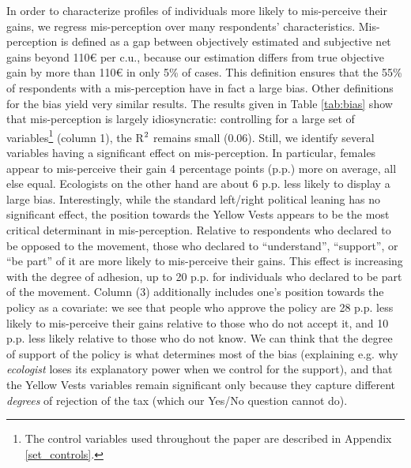 \documentclass[12pt]{article} %
\providecommand{\DIFaddend}{} %
\DeclareRobustCommand{\DIFaddend}{\DIFOaddend \let\includegraphics\DIFOincludegraphics} %
\begin{document}
\DIFaddend In order to characterize profiles of individuals more likely to mis-perceive their gains, we regress mis-perception over many respondents' characteristics. Mis-perception is defined as a gap between objectively estimated and subjective net gains beyond 110\euro{} per c.u., because our estimation differs from true objective gain by more than 110\euro{} in only 5\% of cases. This definition ensures that the 55\% of respondents with a mis-perception have in fact a large bias. Other definitions for the bias yield very similar results. The results given in Table \ref{tab:bias} show that mis-perception is largely idiosyncratic: controlling for a large set of variables\footnote{The control variables used throughout the paper are described in Appendix \ref{set_controls}.} (column 1), the R$^\textnormal{2}$ remains small (0.06). Still, we identify several variables having a significant effect on mis-perception. In particular, females appear to mis-perceive their gain 4 percentage points (p.p.) more on average, all else equal. Ecologists on the other hand are about 6 p.p. less likely to display a large bias. Interestingly, while the standard left/right political leaning has no significant effect, the position towards the Yellow Vests appears to be the most critical determinant in mis-perception. Relative to respondents who declared to be opposed to the movement, those who declared to ``understand'', ``support'', or ``be part'' of it are more likely to mis-perceive their gains. This effect is increasing with the degree of adhesion, up to 20 p.p. for individuals who declared to be part of the movement. Column (3) additionally includes one's position towards the policy as a covariate: we see that people who approve the policy are 28 p.p. less likely to mis-perceive their gains relative to those who do not accept it, and 10 p.p. less likely relative to those who do not know. We can think that the degree of support of the policy is what determines most of the bias (explaining e.g. why \textit{ecologist} loses its explanatory power when we control for the support), and that the Yellow Vests variables remain significant only because they capture different \textit{degrees} of rejection of the tax (which our Yes/No question cannot do).  %
\end{document}
